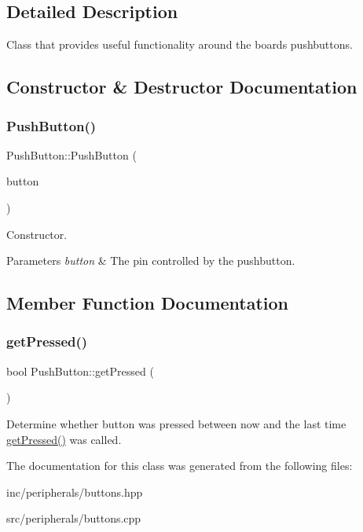 \subsection{Detailed Description}
Class that provides useful functionality around the board\textquotesingle{}s pushbuttons. 

\subsection{Constructor \& Destructor Documentation}
\mbox{\label{classPushButton_a1635369b8e71436a0b1238c6c751972a}} 
\subsubsection{\texorpdfstring{Push\+Button()}{PushButton()}}
{\footnotesize\ttfamily Push\+Button\+::\+Push\+Button (\begin{DoxyParamCaption}\item[{Pin\+Name}]{button }\end{DoxyParamCaption})}

Constructor. 
\begin{DoxyParams}{Parameters}
{\em button} & The pin controlled by the pushbutton. \\
\hline
\end{DoxyParams}


\subsection{Member Function Documentation}
\mbox{\label{classPushButton_af56d1fde8fcbb9e1c4cfceb56be5b467}} 
\subsubsection{\texorpdfstring{get\+Pressed()}{getPressed()}}
{\footnotesize\ttfamily bool Push\+Button\+::get\+Pressed (\begin{DoxyParamCaption}\item[{void}]{ }\end{DoxyParamCaption})}

Determine whether button was pressed between now and the last time \hyperlink{classPushButton_af56d1fde8fcbb9e1c4cfceb56be5b467}{get\+Pressed()} was called. 

The documentation for this class was generated from the following files\+:\begin{DoxyCompactItemize}
\item 
inc/peripherals/buttons.\+hpp\item 
src/peripherals/buttons.\+cpp\end{DoxyCompactItemize}
